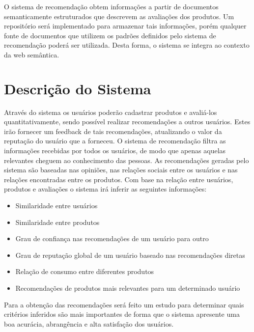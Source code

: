 O sistema de recomendação obtem informações a partir de documentos semanticamente estruturados que descrevem as avaliações dos produtos. Um repositório será implementado para armazenar tais informações, porém qualquer fonte de documentos que utilizem os padrões definidos pelo sistema de recomendação poderá ser utilizada. Desta forma, o sistema se integra ao contexto da web semântica.



\section{Descrição do Sistema}

 Através do sistema os usuários poderão cadastrar produtos e avaliá-los quantitativamente, sendo possível realizar recomendações a outros usuários. Estes irão fornecer um feedback de tais recomendações, atualizando o valor da reputação do usuário que a forneceu. O sistema de recomendação filtra as informações recebidas por todos os usuários, de modo que apenas aquelas relevantes cheguem ao conhecimento das pessoas. As recomendações geradas pelo sistema são baseadas nas opiniões, nas relações sociais entre os usuários e nas relações encontradas entre os produtos. Com base na relação entre usuários, produtos e avaliações o sistema irá inferir as seguintes informações:
 
\begin{itemize}

 \item Similaridade entre usuários

 \item Similaridade entre produtos

 \item Grau de confiança nas recomendações de um usuário para outro

 \item Grau de reputação global de um usuário baseado nas recomendações diretas

 \item Relação de consumo entre diferentes produtos

 \item Recomendações de produtos mais relevantes para um determinado usuário

\end{itemize}

 Para a obtenção das recomendações será feito um estudo para determinar quais critérios inferidos são mais importantes de forma que o sistema apresente uma boa acurácia, abrangência e alta satisfação dos usuários.

